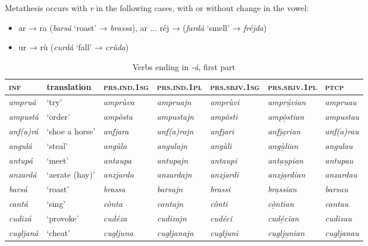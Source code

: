 Metathesis occurs with \textit{r} in the following cases, with or without change in the vowel:

\begin{itemize}
	\item ar → ra (\textit{barsá} `roast' → \textit{brassa}), ar ... réj → (\textit{fardá} `smell' → \textit{fréjda})
	\item ur → rù (\textit{curdá} `fall' → \textit{crùda})
\end{itemize}


\begin{sidewaystable}
	\caption{Verbs ending in \textit{-á}, first part}
	\label{stemalta1}
	\begin{tabularx}{\textwidth}{lllllll}
		\lsptoprule
		\textsc{\textbf{inf}} & \textbf{translation} & \textsc{\textbf{prs.ind.1sg}} & \textsc{\textbf{prs.ind.1pl}} & \textsc{\textbf{prs.sbjv.1sg}} & \textsc{\textbf{prs.sbjv.1pl}} & \textsc{\textbf{ptcp}} \\
		\midrule
		\textit{ampruá} & `try' & \textit{amprùva} & \textit{ampruajn} &  \textit{amprùvi} & \textit{amprú̱vian} & \textit{ampruau} \\
		\textit{ampustá} & `order' & \textit{ampòsta} & \textit{ampustajn} & \textit{ampòsti} & \textit{ampò̱stian} & \textit{ampustau}\\
		\textit{anf(a)rá} & ‘shoe a horse’ & \textit{anfjara} & \textit{anf(a)rajn} &  \textit{anfjari} & \textit{anfja̱rian} & \textit{anf(a)rau}\\
		\textit{angulá} & `steal' & \textit{angùla} & \textit{angulajn} & \textit{angùli} & \textit{angù̱lian} & \textit{angulau}\\
		\textit{antupá} & `meet' & \textit{antaupa} & \textit{antupajn} & \textit{antaupi} & \textit{anta̱u̱pian} & \textit{antupau}\\
		\textit{anzardá} & `aerate (hay)' & \textit{anzjarda} & \textit{anzardajn} & \textit{anzjardi} & \textit{anzja̱rdian} & \textit{anzardau}\\
		\textit{barsá} & ‘roast’ & \textit{brassa} & \textit{barsajn} & \textit{brassi}& \textit{bra̱ssian} & \textit{barsau}\\
		\textit{cantá} & ‘sing’ & \textit{cònta} & \textit{cantajn} & \textit{cònti} & \textit{cò̱ntian} & \textit{cantau}\\
		\textit{cudizá} & ‘provoke’ & \textit{cudéza} & \textit{cudizajn} & \textit{cudéci} & \textit{cudé̱cian} & \textit{cudizau}\\
		\textit{cugljaná} & ‘cheat’ & \textit{cugljuna} & \textit{cugljanajn} & \textit{cugljuni} & \textit{cuglju̱nian} & \textit{cugljanau}\\

\end{tabularx}
\end{sidewaystable}
